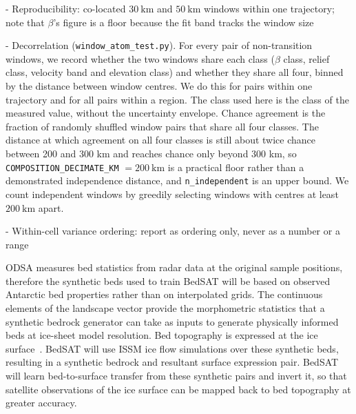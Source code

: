   - Reproducibility: co-located $30~\mathrm{km}$ and $50~\mathrm{km}$ windows within one trajectory; note that $\beta$'s figure is a floor because the fit band tracks the window size

  - Decorrelation (\texttt{window\_atom\_test.py}). For every pair of non-transition windows, we record whether the two windows share each class ($\beta$ class, relief class,
  velocity band and elevation class) and whether they share all four, binned by the distance between window centres. We do this for pairs within one trajectory and for all pairs within a region. The class used here is the class of the measured value, without the uncertainty envelope. Chance agreement is the fraction of randomly shuffled window pairs that share all four classes. The distance at which agreement on all four classes is still about twice chance between 200 and 300 km and reaches chance only beyond 300 km, so \texttt{COMPOSITION\_DECIMATE\_KM} $= 200~\mathrm{km}$ is a practical floor rather than a demonstrated independence distance, and \texttt{n\_independent} is an upper bound. We count independent windows by greedily selecting windows with centres at least $200~\mathrm{km}$ apart.

  - Within-cell variance ordering: report as ordering only, never as a number or a range


ODSA measures bed statistics from radar data at the original sample positions, therefore the synthetic beds used to train BedSAT will be based on observed Antarctic bed properties rather than on interpolated grids. The continuous elements of the landscape vector provide the morphometric statistics that a synthetic bedrock generator can take as inputs to generate physically  informed beds at ice-sheet model resolution. Bed topography is expressed at the ice surface~\cite{Gudmundsson_2003, DeRydt_2013}. BedSAT will use ISSM ice flow simulations over these synthetic beds, resulting in a synthetic bedrock and resultant surface expression pair. BedSAT will learn bed-to-surface transfer from these synthetic pairs and invert it, so that satellite observations of the ice surface can be mapped back to bed topography at greater accuracy. 


